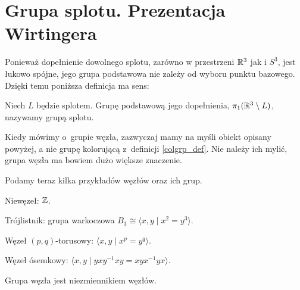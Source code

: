\section{Grupa splotu. Prezentacja Wirtingera} %
\label{sec:group_wirtinger}

Ponieważ dopełnienie dowolnego splotu, zarówno w przestrzeni $\mathbb R^3$ jak i $S^3$, jest łukowo spójne, jego grupa podstawowa nie zależy od wyboru punktu bazowego.
Dzięki temu poniższa definicja ma sens:

\begin{definition}
    \label{def:knot_group}
    Niech $L$ będzie splotem.
    Grupę podstawową jego dopełnienia, $\pi_1(\mathbb R^3 \setminus L)$, nazywamy grupą splotu.
\end{definition}

Kiedy mówimy o~grupie węzła, zazwyczaj mamy na myśli obiekt opisany powyżej, a nie grupę kolorującą z~definicji \ref{colgrp_def}.
Nie należy ich mylić, grupa węzła ma bowiem dużo większe znaczenie.

Podamy teraz kilka przykładów węzłów oraz ich grup.

\begin{example}
    Niewęzeł: $\mathbb Z$.
\end{example}

\begin{example}
    Trójlistnik: grupa warkoczowa $B_3 \cong \langle x, y \mid x^2 = y^3\rangle$.
\end{example}

\begin{example}
    Węzeł $(p,q)$-torusowy: $\langle x, y \mid x^p = y^q \rangle$.
\end{example}

\begin{example}
    Węzeł ósemkowy: $\langle x, y \mid yxy^{{-1}}xy=xyx^{{-1}}yx \rangle$.
\end{example}


\begin{proposition}
    \label{prop:knot_group_invariant}
    Grupa węzła jest niezmiennikiem węzłów.
\end{proposition}

